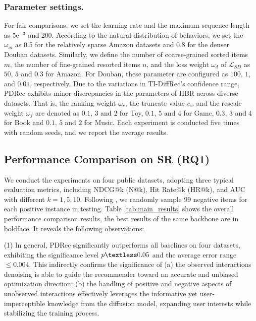 \documentclass[letterpaper]{article} %
\begin{document}
\subsubsection{Parameter settings.}
For fair comparisons, we set the learning rate and the maximum sequence length as 5e$^{-3}$ and 200. According to the natural distribution of behaviors, we set the $\omega_m$ as 0.5 for the relatively sparse Amazon datasets and 0.8 for the denser Douban datasets. Similarly, we define the number of coarse-grained sorted items $m$, the number of fine-grained resorted items $n$, and the loss weight $\omega_d$ of $\mathcal{L}_{SD}$ as $50$, $5$ and $0.3$ for Amazon. For Douban, these parameter are configured as $100$, $1$, and $0.01$, respectively. Due to the variations in TI-DiffRec's confidence range, PDRec exhibits minor discrepancies in the parameters of HBR across diverse datasets. That is, the ranking weight $\omega_r$, the truncate value $c_w$ and the rescale weight $\omega_f$ are denoted as $0.1$, $3$ and $2$ for Toy, $0.1$, $5$ and $4$ for Game, $0.3$, $3$ and $4$ for Book and $0.1$, $5$ and $2$ for Music. Each experiment is conducted five times with random seeds, and we report the average results.

\subsection{Performance Comparison on SR (RQ1)}
\label{sec.performance}
We conduct the experiments on four public datasets, adopting three typical evaluation metrics, including NDCG@k (N@k), Hit Rate@k (HR@k), and AUC with different $k=1,5,10$. Following \cite{SASRec}, we randomly sample 99 negative items for each positive instance in testing. Table \ref{tab:main_results} shows the overall performance comparison results, the best results of the same backbone are in boldface. It reveals the following observations:

(1) In general, PDRec significantly outperforms all baselines on four datasets, exhibiting the significance level $p \textless 0.05$ and the average error range $\leq 0.004$. This indirectly confirms the significance of (a) the observed interactions denoising is able to guide the recommender toward an accurate and unbiased optimization direction; (b) the handling of positive and negative aspects of unobserved interactions effectively leverages the informative yet user-imperceptible knowledge from the diffusion model, expanding user interests while stabilizing the training process.
\end{document}
